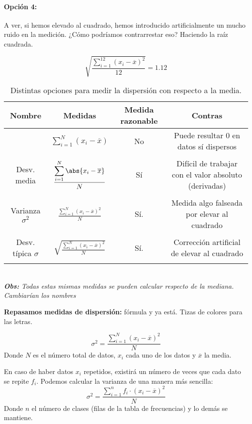 \paragraph{Opción 4:} A ver, si hemos elevado al cuadrado, hemos introducido artificialmente un mucho ruido en la medición. ¿Cómo podríamos contrarrestar eso? Haciendo la raíz cuadrada.

\[ \sqrt{\frac{\displaystyle\sum_{i=1}^{12} \left(x_i-\overline{x}\right)^2}{12}} = 1.12\]

\begin{table}[hbtp]
\centering
\label{SD:medidasDispersion}
\caption{Distintas opciones para medir la dispersión con respecto a la media.}
\begin{tabular}{c|ccc}
\textbf{Nombre} & \textbf{Medidas} & \textbf{Medida razonable} & \textbf{Contras}\\\hline\hline
 & $\displaystyle\sum_{i=1}^{N} (x_i-\overline{x})$ & No & Puede resultar 0 en datos sí dispersos\\\\
Desv. media  & $\displaystyle\frac{\displaystyle\sum_{i=1}^{N} \abs{x_i-\overline{x}}}{N}$ & Sí & Difícil de trabajar con el valor absoluto (derivadas)\\\\
Varianza $\sigma^2$ & $\displaystyle \frac{\displaystyle\sum_{i=1}^{N} \left(x_i-\overline{x}\right)^2}{N}$ & Sí. & Medida algo falseada por elevar al cuadrado\\\\
Desv. típica $\sigma$ & $\displaystyle \sqrt{\frac{\displaystyle\sum_{i=1}^{N} \left(x_i-\overline{x}\right)^2}{N}}$ &Sí. & Corrección artificial de elevar al cuadrado\\\\\hline
\end{tabular}
\\
\textit{\textbf{Obs:} Todas estas mismas medidas se pueden calcular respecto de la mediana. Cambiarían los nombres}
\end{table}


\textbf{Repasamos medidas de dispersión: } fórmula y ya está. Tizas de colores para las letras.

\begin{defn}[Varianza]
\[
	\sigma^2 = \frac{\displaystyle\sum_{i=1}^{N} \left(x_i-\overline{x}\right)^2}{N}
\]
Donde $N$ es el número total de datos, $x_i$ cada uno de los datos y $\overline{x}$ la media.

\obs En caso de haber datos $x_i$ repetidos, existirá un número de veces que cada dato se repite $f_i$. 
%
Podemos calcular la varianza de una manera más sencilla:
\[
	\sigma^2 = \frac{\displaystyle\sum_{i=1}^{n} f_i·\left(x_i-\overline{x}\right)^2}{N}
\]
Donde $n$ el número de clases (filas de la tabla de frecuencias) y lo demás se mantiene.
\end{defn}

